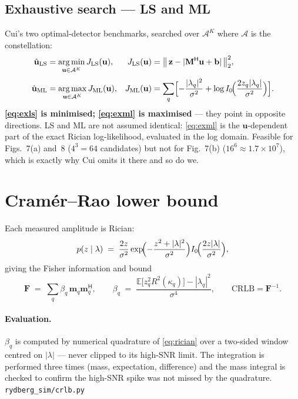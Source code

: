 \documentclass[11pt,a4paper]{article}
\newcommand{\src}[1]{{\footnotesize\color{srcgray}\texttt{#1}}}
\newcommand{\E}{\mathbb{E}}
\newcommand{\herm}{\mathsf{H}}
\newcommand{\mat}[1]{\mathbf{#1}}
\newcommand{\vect}[1]{\mathbf{#1}}
\DeclareMathOperator*{\argmin}{arg\,min}
\DeclareMathOperator*{\argmax}{arg\,max}
\begin{document}
\subsection{Exhaustive search --- LS and ML}
Cui's two optimal-detector benchmarks, searched over $\mathcal{A}^K$ where
$\mathcal{A}$ is the constellation:
\begin{align}
\hat{\vect{u}}_{\mathrm{LS}} &= \argmin_{\vect{u}\in\mathcal{A}^K}
  J_{\mathrm{LS}}(\vect{u}),
& J_{\mathrm{LS}}(\vect{u}) &=
  \bigl\|\,\vect{z}-|\mat{M}^{\herm}\vect{u}+\vect{b}|\,\bigr\|_2^2,
\label{eq:exls}\\[1mm]
\hat{\vect{u}}_{\mathrm{ML}} &= \argmax_{\vect{u}\in\mathcal{A}^K}
  J_{\mathrm{ML}}(\vect{u}),
& J_{\mathrm{ML}}(\vect{u}) &=
  \sum_q\Bigl[-\frac{|\lambda_q|^2}{\sigma^2}
  +\log I_0\!\Bigl(\frac{2 z_q|\lambda_q|}{\sigma^2}\Bigr)\Bigr].
\label{eq:exml}
\end{align}
\textbf{\eqref{eq:exls} is minimised; \eqref{eq:exml} is maximised} --- they
point in opposite directions. LS and ML are not assumed identical:
\eqref{eq:exml} is the $\vect{u}$-dependent part of the exact Rician
log-likelihood, evaluated in the log domain. Feasible for Figs.~7(a) and~8
($4^3=64$ candidates) but not for Fig.~7(b)
($16^6\approx1.7\times10^7$), which is exactly why Cui omits it there and so
do we.

\section{Cram\'er--Rao lower bound}\label{sec:crlb}

Each measured amplitude is Rician:
\begin{equation}
p(z\mid\lambda) \;=\; \frac{2z}{\sigma^2}
  \exp\!\Bigl(-\frac{z^2+|\lambda|^2}{\sigma^2}\Bigr)
  I_0\!\Bigl(\frac{2z|\lambda|}{\sigma^2}\Bigr),
\label{eq:rician}
\end{equation}
giving the Fisher information and bound
\begin{equation}
\mat{F} \;=\; \sum_q \beta_q\,\vect{m}_q\vect{m}_q^{\herm},
\qquad
\beta_q \;=\;
  \frac{\E\bigl[z_q^2R^2(\kappa_q)\bigr]-|\lambda_q|^2}{\sigma^4},
\qquad
\mathrm{CRLB} = \mat{F}^{-1}.
\label{eq:crlb}
\end{equation}

\paragraph{Evaluation.} $\beta_q$ is computed by numerical quadrature of
\eqref{eq:rician} over a two-sided window centred on $|\lambda|$ --- never
clipped to its high-SNR limit. The integration is performed three times (mass,
expectation, difference) and the mass integral is checked to confirm the
high-SNR spike was not missed by the quadrature.
\src{rydberg\_sim/crlb.py}
\end{document}
